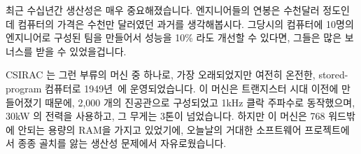  \QuickQuizEnd

최근 수십년간 생산성은 매우 중요해졌습니다.
엔지니어들의 연봉은 수천달러 정도인데 컴퓨터의 가격은 수천만 달러였던 과거를
생각해봅시다.
그당시의 컴퓨터에 10명의 엔지니어로 구성된 팀을 만들어서 성능을 10\% 라도
개선할 수 있다면, 그들은 많은 보너스를 받을 수 있었을겁니다.


CSIRAC 는 그런 부류의 머신 중 하나로, 가장 오래되었지만 여전히 온전한,
stored-program 컴퓨터로
1949년~\cite{CSIRACMuseumVictoria,CSIRACUniversityMelbourne}에 운영되었습니다.
이 머신은 트랜지스터 시대 이전에 만들어졌기 때문에, 2,000 개의 진공관으로
구성되었고 1kHz 클락 주파수로 동작했으며, 30kW 의 전력을 사용하고, 그 무게는
3톤이 넘었습니다.
하지만 이 머신은 768 워드밖에 안되는 용량의 RAM을 가지고 있었기에, 오늘날의
거대한 소프트웨어 프로젝트에서 종종 골치를 앓는 생산성 문제에서 자유로웠습니다.

